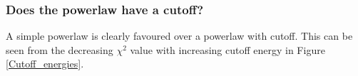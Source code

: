 \documentclass[a4paper]{article}
\begin{document}
\subsubsection{Does the powerlaw have a cutoff?}
A simple powerlaw is clearly favoured over a powerlaw with cutoff. This can be seen from the decreasing $\chi^2$ value with increasing cutoff energy in Figure \ref{Cutoff_energies}. 
\begin{figure}[h]
\end{figure}
\end{document}
